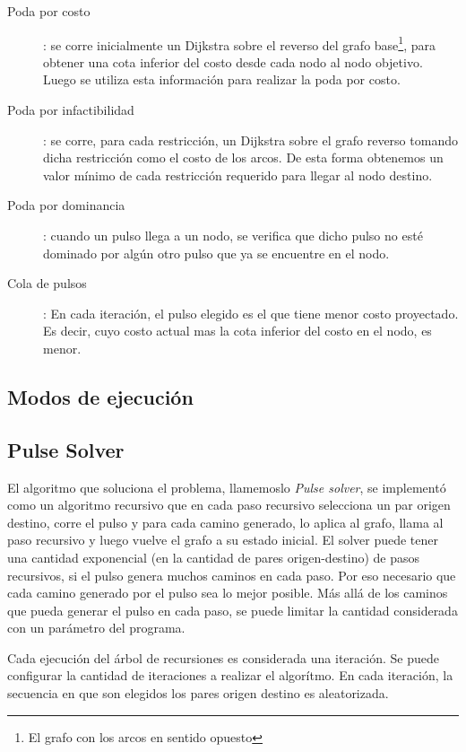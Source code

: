 \documentclass{article}
\begin{document}
  \begin{description}
    \item[Poda por costo]: {se corre inicialmente un Dijkstra sobre el reverso del grafo base\footnote{El grafo con los arcos en sentido opuesto}, para obtener una cota inferior del costo desde cada nodo al nodo objetivo. Luego se utiliza esta información para realizar la poda por costo.}
    \item[Poda por infactibilidad]: {se corre, para cada restricción, un Dijkstra sobre el grafo reverso tomando dicha restricción como el costo de los arcos. De esta forma obtenemos un valor mínimo de cada restricción requerido para llegar al nodo destino.}
    \item[Poda por dominancia]: {cuando un pulso llega a un nodo, se verifica que dicho pulso no esté dominado por algún otro pulso que ya se encuentre en el nodo.}
    \item[Cola de pulsos]: {En cada iteración, el pulso elegido es el que tiene menor costo proyectado. Es decir, cuyo costo actual mas la cota inferior del costo en el nodo, es menor.}
  \end{description}

  \subsection*{Modos de ejecución}

  \subsection*{Pulse Solver}

  El algoritmo que soluciona el problema, llamemoslo {\it Pulse solver}, se implementó como un algoritmo recursivo que en cada paso recursivo selecciona un par origen destino, corre el pulso y para cada camino generado, lo aplica al grafo, llama al paso recursivo y luego vuelve el grafo a su estado inicial. El solver puede tener una cantidad exponencial (en la cantidad de pares origen-destino) de pasos recursivos, si el pulso genera muchos caminos en cada paso. Por eso necesario que cada camino generado por el pulso sea lo mejor posible. Más allá de los caminos que pueda generar el pulso en cada paso, se puede limitar la cantidad considerada con un parámetro del programa.

  Cada ejecución del árbol de recursiones es considerada una iteración. Se puede configurar la cantidad de iteraciones a realizar el algorítmo. En cada iteración, la secuencia en que son elegidos los pares origen destino es aleatorizada.
\end{document}
